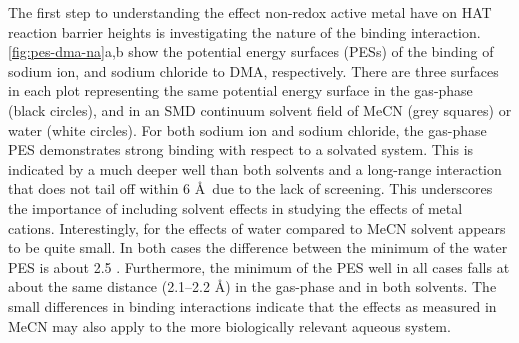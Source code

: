 \begin{doublespace}
The first step to understanding the effect non-redox active metal have on HAT
reaction barrier heights is investigating the nature of the binding interaction.
\ref{fig:pes-dma-na}a,b show the potential energy surfaces (PESs) of the binding
of sodium ion, and sodium chloride to DMA, respectively. There are three
surfaces in each plot representing the same potential energy surface in the
gas-phase (black circles), and in an SMD\cite{Marenich2009} continuum solvent
field of MeCN (grey squares) or water (white circles). For both sodium ion and
sodium chloride, the gas-phase PES demonstrates strong binding with respect to a
solvated system. This is indicated by a much deeper well than both solvents and
a long-range interaction that does not tail off within 6 \AA\ due to the lack of
screening. This underscores the importance of including solvent effects in
studying the effects of metal cations. Interestingly, for the effects of water
compared to MeCN solvent appears to be quite small. In both cases the difference
between the minimum of the water PES is about 2.5 \kcalmol. Furthermore, the
minimum of the PES well in all cases falls at about the same distance (2.1--2.2
\AA) in the gas-phase and in both solvents. The small differences in binding
interactions indicate that the effects as measured in MeCN may also apply to the
more biologically relevant aqueous system.


\end{doublespace}
